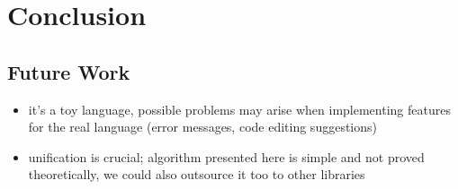 \chapter{Conclusion}
\label{chap:conclusion}


\section{Future Work}

\begin{itemize}
  \item it's a toy language, possible problems may arise when implementing features for the real language (error messages, code editing suggestions)
  \item unification is crucial; algorithm presented here is simple and not proved theoretically, we could also outsource it too to other libraries
\end{itemize}
